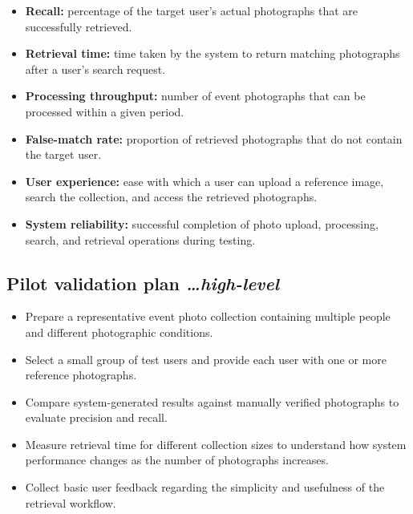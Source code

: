 \documentclass[11pt,a4paper]{article}
\newcommand{\BvrHint}[1]{%
  {\normalfont\normalsize\itshape\hfill #1}}
\begin{document}
\begin{itemize}[leftmargin=0.7cm]
    \item \textbf{Recall:} percentage of the target user's actual
    photographs that are successfully retrieved.

    \item \textbf{Retrieval time:} time taken by the system to return
    matching photographs after a user's search request.

    \item \textbf{Processing throughput:} number of event photographs
    that can be processed within a given period.

    \item \textbf{False-match rate:} proportion of retrieved
    photographs that do not contain the target user.

    \item \textbf{User experience:} ease with which a user can upload a
    reference image, search the collection, and access the retrieved
    photographs.

    \item \textbf{System reliability:} successful completion of photo
    upload, processing, search, and retrieval operations during
    testing.
\end{itemize}

\subsection{Pilot validation plan %
  \BvrHint{\ldots high-level}}

\begin{itemize}[leftmargin=0.7cm]
    \item Prepare a representative event photo collection containing
    multiple people and different photographic conditions.

    \item Select a small group of test users and provide each user with
    one or more reference photographs.

    \item Compare system-generated results against manually verified
    photographs to evaluate precision and recall.

    \item Measure retrieval time for different collection sizes to
    understand how system performance changes as the number of
    photographs increases.

    \item Collect basic user feedback regarding the simplicity and
    usefulness of the retrieval workflow.
\end{itemize}
\end{document}
